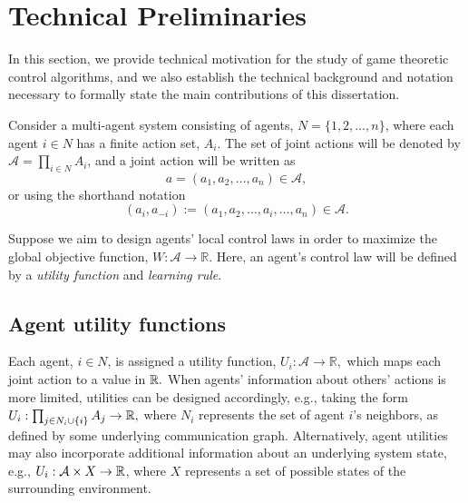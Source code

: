 


\section{Technical Preliminaries}

In this section, we provide technical motivation for the study of game theoretic control algorithms, and we also establish the technical background and notation necessary to formally state the main contributions of this dissertation.

Consider a multi-agent system consisting of agents, $N = \{1,2,\ldots,n\}$, where each agent $i\in N$ has a finite action set, $A_i$. The set of joint actions will be denoted by $\mathcal{A} = \prod_{i\in N} A_i$,  and a joint action will be written as $$a = (a_1,a_2,\ldots,a_n)\in\mathcal{A},$$ or using the shorthand notation $$(a_i,a_{-i}) := (a_1,a_2,\ldots,a_i,\ldots,a_n)\in\mathcal{A}.$$ 


Suppose we aim to design agents' local control laws in order to maximize the global objective function, $W:\mathcal{A}\to \mathbb{R}.$ Here, an agent's control law will be defined by a {\it utility function} and {\it learning rule}.


\subsection{Agent utility functions}


Each agent, $i\in N$, is assigned a utility function, $U_i: \mathcal{A}\to\mathbb{R},$ which maps each joint action to a value in $\mathbb{R}.$  When agents' information about others' actions is more limited, utilities can be designed accordingly, e.g., taking the form $U_i:\prod_{j\in N_i\cup \{i\}}A_j\to \mathbb{R},$ where $N_i$ represents the set of agent $i$'s neighbors, as defined by some underlying communication graph. Alternatively, agent utilities may also incorporate additional information about an underlying system state, e.g., $U_i:\mathcal{A}\times X\to \mathbb{R}$, where $X$ represents a set of possible states of the surrounding environment.

